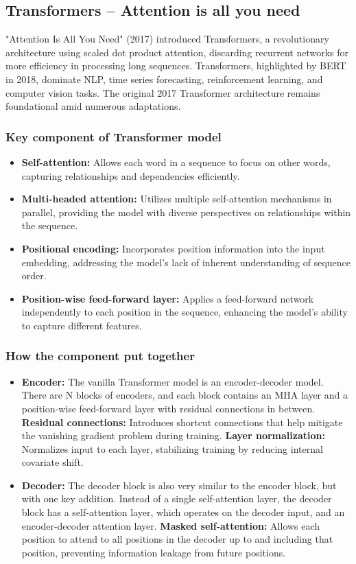 \documentclass{article}
\begin{document}
\subsection{Transformers – Attention is all you need}
"Attention Is All You Need" (2017) introduced Transformers, a revolutionary architecture using scaled dot product attention, discarding recurrent networks for more efficiency in processing long sequences. Transformers, highlighted by BERT in 2018, dominate NLP, time series forecasting, reinforcement learning, and computer vision tasks. The original 2017 Transformer architecture remains foundational amid numerous adaptations.
\subsubsection{Key component of Transformer model}
\begin{itemize}
    \item \textbf{Self-attention: }Allows each word in a sequence to focus on other words, capturing relationships and dependencies efficiently.
    \item \textbf{Multi-headed attention: }Utilizes multiple self-attention mechanisms in parallel, providing the model with diverse perspectives on relationships within the sequence.
    \item \textbf{Positional encoding: }Incorporates position information into the input embedding, addressing the model's lack of inherent understanding of sequence order.
    \item \textbf{Position-wise feed-forward layer: }Applies a feed-forward network independently to each position in the sequence, enhancing the model's ability to capture different features.
\end{itemize}
\subsubsection{How the component put together}
\begin{itemize}
    \item \textbf{Encoder: }The vanilla Transformer model is an encoder-decoder model. There are N blocks of encoders, and each block contains an MHA layer and a position-wise feed-forward layer with residual connections in between.
    \subitem \textbf{Residual connections: }Introduces shortcut connections that help mitigate the vanishing gradient problem during training.
    \subitem \textbf{Layer normalization: }Normalizes input to each layer, stabilizing training by reducing internal covariate shift.
    \item \textbf{Decoder: }The decoder block is also very similar to the encoder block, but with one key addition. Instead of a single self-attention layer, the decoder block has a self-attention layer, which operates on the decoder input, and an encoder-decoder attention layer.  
    \subitem \textbf{Masked self-attention: }Allows each position to attend to all positions in the decoder up to and including that position, preventing information leakage from future positions.
\end{itemize}
\end{document}

